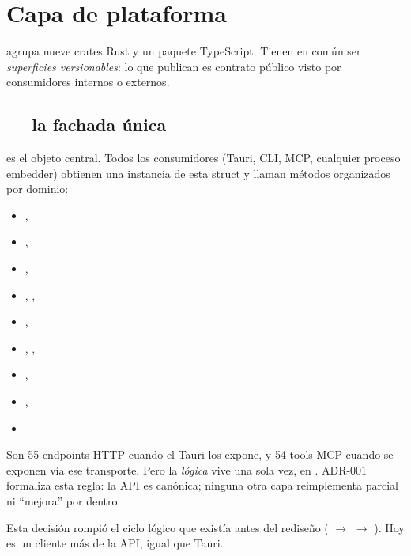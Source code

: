 \chapter{Capa de plataforma}
\label{sec:capa-platform}

 agrupa nueve crates Rust y un paquete
TypeScript. Tienen en común ser \emph{superficies versionables}: lo
que publican es contrato público visto por consumidores internos o
externos.

\section{ — la fachada única}

 es el objeto central. Todos los consumidores
(Tauri, CLI, MCP, cualquier proceso embedder) obtienen una
instancia de esta struct y llaman métodos organizados por dominio:

\begin{itemize}
    \item {}, 
    \item {}, 
    \item {}, 
    \item {}, ,
    \item {}, 
    \item {}, ,
    \item {},
    \item {}, 
    \item {}
\end{itemize}

Son 55 endpoints HTTP cuando el Tauri los expone, y 54 tools MCP
cuando se exponen vía ese transporte. Pero la \emph{lógica} vive
una sola vez, en . ADR-001 formaliza esta
regla: la API es canónica; ninguna otra capa reimplementa parcial
ni ``mejora'' por dentro.

Esta decisión rompió el ciclo lógico que existía antes del
rediseño ( $\to$  $\to$
). Hoy  es un cliente más de la
API, igual que Tauri.

